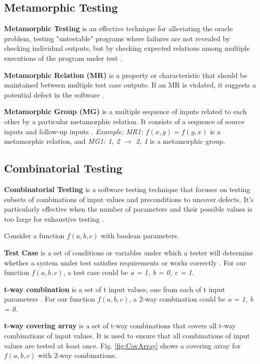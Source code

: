 \subsection{Metamorphic Testing}

\textbf{Metamorphic Testing} is an effective technique for alleviating the oracle problem, testing "untestable" programs where failures are not revealed by checking individual outputs, but by checking expected relations among multiple executions of the program under test \cite{CybersecurityMT}.

\textbf{Metamorphic Relation (MR)} is a property or characteristic that should be maintained between multiple test case outputs. If an MR is violated, it suggests a potential defect in the software \cite{MetamorphicTestingReview}.

\textbf{Metamorphic Group (MG)} is a multiple sequence of inputs related to each other by a particular metamorphic relation. It consists of a sequence of source inputs and follow-up inputs \cite{MetamorphicTestingReview}. \textit{Example:} \textit{MR1: $f(x, y) = f(y, x)$} is a metamorphic relation, and \textit{MG1: {1, 2} $\rightarrow$ {2, 1}} is a metamorphic group.

\subsection{Combinatorial Testing}

\textbf{Combinatorial Testing} is a software testing technique that focuses on testing subsets of combinations of input values and preconditions to uncover defects. It's particularly effective when the number of parameters and their possible values is too large for exhaustive testing \cite{FELDERER20161}.

Consider a function $f(a, b, c)$ with boolean parameters.

\textbf{Test Case} is a set of conditions or variables under which a tester will determine whether a system under test satisfies requirements or works correctly \cite{comer}. For our function $f(a, b, c)$, a test case could be \textit{a = 1, b = 0, c = 1}.

\textbf{t-way combination} is a set of t input values, one from each of t input parameters \cite{comer}. For our function $f(a, b, c)$, a 2-way combination could be \textit{a = 1, b = 0}.

\textbf{t-way covering array} is a set of t-way combinations that covers all t-way combinations of input values. It is used to ensure that all combinations of input values are tested at least once. Fig. \ref{fig:CovArray} shows a covering array for $f(a, b, c)$ with 2-way combinations.

